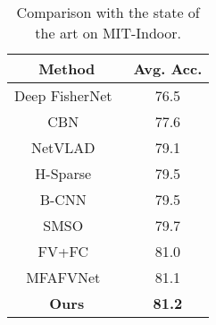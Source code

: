 \documentclass{bmvc2k}
\newcommand{\comment}[1]{}
\newcommand{\comment}[1]{}
\begin{document}
\comment{
\subsection{Comparison to State of art}
\label{sec:state-of-the-art}

\paragraph{MIT-Indoor Dataset:} We compare our method with the current state-of-art techniques in Table~\ref{table:mit_comparison}. Deep FisherNet~\cite{deepfishernet} formulates an approximate fisher vector encoding with multi-scale patch extraction achieving $76.5\%$ accuracy.
B-CNN~\cite{bcnn} method with large 250k dimension feature vector to pool the features from two-stream network and achieves $79.5\%$.
Our method has achieved the state-of-the-art of $81.40\%$ outperforming current state-of-the-art MFAFVNet~\cite{mfafvnet} of 81.12\%, which uses accurate fisher vector encoding of 500K dimension with multi-scale patch approach. 
}\def\hfillx{\hspace*{-\textwidth} \hfill}\begin{table}
	\begin{minipage}{0.3\textwidth}
	\centering
	\small	
	\begin{tabular}{|c|c|}
		\hline
		Method                                & Avg. Acc.\\
		\hline
		Deep FisherNet~\cite{deepfishernet}   & 76.5  \\
		CBN~\cite{compatcBN}                  & 77.6  \\
		NetVLAD~\cite{netvlad}                & 79.1  \\
		H-Sparse~\cite{sparsecoding}          & 79.5  \\
		B-CNN~\cite{bcnn}                     & 79.5  \\
		SMSO~\cite{Secondorderkaicheng2018}   & 79.7  \\
		FV+FC~\cite{FVFC}                     & 81.0   \\
		MFAFVNet~\cite{mfafvnet}              & 81.1  \\
		\hline
		\textbf{Ours}                  & \textbf{81.2}  \\
		\hline
	\end{tabular}
	\vspace{0.1in}
	\caption{\label{table:mit_comparison}Comparison with the state of the art on MIT-Indoor.}
	\end{minipage}
	\hfill
	\begin{minipage}{0.6\textwidth}
	\centering
	\small	


\end{minipage}
\end{table}
\end{document}
